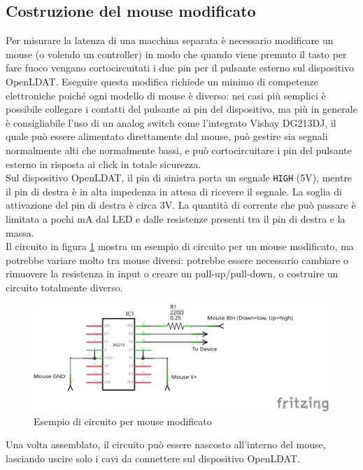 \subsection{Costruzione del mouse modificato}
Per misurare la latenza di una macchina separata è necessario modificare un mouse (o volendo un controller) in modo che quando viene premuto il tasto per fare fuoco vengano cortocircuitati i due pin per il pulsante esterno sul dispositivo OpenLDAT. Eseguire questa modifica richiede un minimo di competenze elettroniche poiché ogni modello di mouse è diverso: nei casi più semplici è possibile collegare i contatti del pulsante ai pin del dispositivo, ma più in generale è consigliabile l'uso di un analog switch come l'integrato Vishay DG213DJ\cite{vishay_dg213_datasheet}, il quale può essere alimentato direttamente dal mouse, può gestire sia segnali normalmente alti che normalmente bassi, e può cortocircuitare i pin del pulsante esterno in risposta ai click in totale sicurezza.\\
Sul dispositivo OpenLDAT, il pin di sinistra porta un segnale \texttt{HIGH} (5V), mentre il pin di destra è in alta impedenza in attesa di ricevere il segnale. La soglia di attivazione del pin di destra è circa 3V\cite{atmega32u4_datasheet}. La quantità di corrente che può passare è limitata a pochi mA dal LED e dalle resistenze presenti tra il pin di destra e la massa.\\
Il circuito in figura \ref{fig:modmouse_example} mostra un esempio di circuito per un mouse modificato, ma potrebbe variare molto tra mouse diversi: potrebbe essere necessario cambiare o rimuovere la resistenza in input o creare un pull-up/pull-down, o costruire un circuito totalmente diverso.

\begin{figure}[h!]
	\centering
	\includegraphics[width=\textwidth]{Dispositivo_files/modmouse_example.png}
	\caption{Esempio di circuito per mouse modificato}
	\label{fig:modmouse_example}
\end{figure}

Una volta assemblato, il circuito può essere nascosto all'interno del mouse, lasciando uscire solo i cavi da connettere sul dispositivo OpenLDAT.

